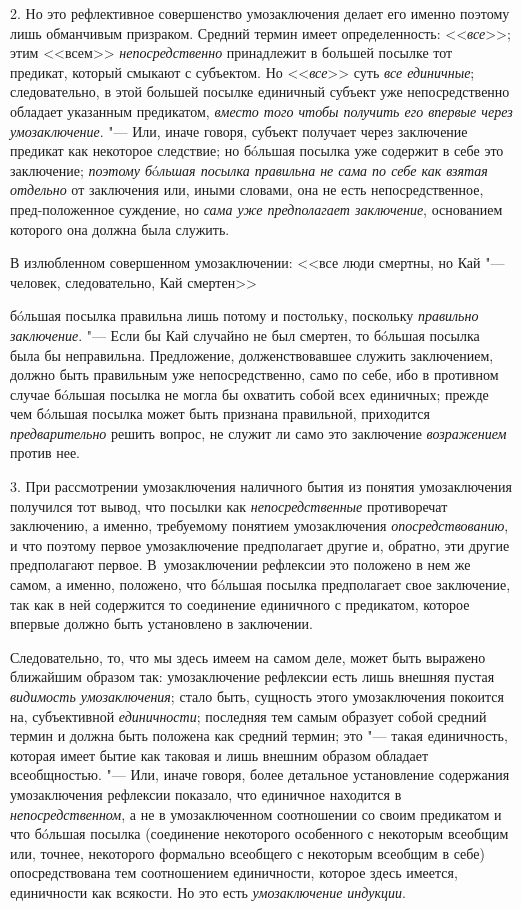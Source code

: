 {{2. Но это рефлективное совершенство умозаключения делает его
именно поэтому лишь обманчивым призраком. Средний термин имеет
определенность: <<{\em все}>>;
этим <<всем>>
{\em непосредственно}
принадлежит в большей посылке тот предикат, который смыкают с
субъектом. Но <<{\em все}>>
суть {\em все единичные};
следовательно, в этой большей посылке единичный субъект уже
непосредственно обладает указанным предикатом,
{\em вместо того чтобы получить его
впервые через умозаключение}. "--- Или, иначе говоря, субъект
получает через заключение предикат как некоторое следствие; но бóльшая
посылка уже содержит в себе это заключение;
{\em поэтому
б}ó{\em льшая посылка правильна не сама
по себе как взятая отдельно} от заключения или, иными
словами, она не есть непосредственное, пред-положенное суждение, но
{\em сама уже предполагает заключение},
основанием которого она должна была служить.

В излюбленном совершенном умозаключении:
<<все люди смертны,
но Кай "--- человек,
следовательно, Кай смертен>>

бóльшая посылка правильна лишь потому и постольку, поскольку
{\em правильно заключение}. "---
Если бы Кай случайно не был смертен, то бóльшая посылка была
бы неправильна. Предложение, долженствовавшее служить заключением, должно
быть правильным уже непосредственно, само по себе, ибо в противном случае
бóльшая посылка не могла бы охватить собой всех единичных; прежде чем
бóльшая посылка может быть признана правильной, приходится
{\em предварительно}
решить вопрос, не служит ли само это заключение
{\em возражением} против
нее.

3. При рассмотрении умозаключения наличного бытия из понятия
умозаключения получился тот вывод, что посылки как
{\em непосредственные}
противоречат заключению, а именно, требуемому понятием
умозаключения {\em опосредствованию},
и что поэтому первое умозаключение предполагает другие и,
обратно, эти другие предполагают первое. В~умозаключении рефлексии это
положено в нем же самом, а именно, положено, что бóльшая
посылка предполагает свое заключение, так как в ней содержится то
соединение единичного с предикатом, которое впервые должно быть установлено
в заключении.

Следовательно, то, что мы здесь имеем на самом деле, может
быть выражено ближайшим образом так: умозаключение рефлексии есть лишь
внешняя пустая {\em видимость
умозаключения}; стало быть, сущность этого умозаключения
покоится на, субъективной
{\em единичности};
последняя тем самым образует собой средний термин и должна
быть положена как средний термин; это "--- такая единичность,
которая имеет бытие как таковая и лишь внешним образом обладает
всеобщностью. "--- Или, иначе говоря, более детальное
установление содержания умозаключения рефлексии показало, что единичное
находится в {\em непосредственном},
а не в умозаключенном соотношении со своим предикатом и что
бóльшая посылка (соединение некоторого особенного с некоторым всеобщим или,
точнее, некоторого формально всеобщего с некоторым всеобщим в себе)
опосредствована тем соотношением единичности, которое здесь имеется,
единичности как всякости. Но это есть
{\em умозаключение индукции}.

}}
